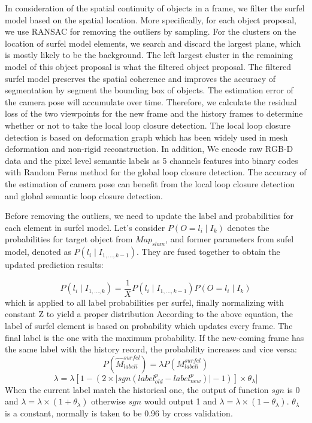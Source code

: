 \documentclass[conference]{IEEEtran}
\begin{document}
In consideration of the spatial continuity of objects in a frame, we filter the surfel model based on the spatial location.  More specifically, for each object proposal, we use RANSAC for removing the outliers by sampling. For the clusters on the location of surfel model elements, we search and discard the largest plane, which is mostly likely to be the background. The left largest cluster in the remaining model of this object proposal is what the filtered object proposal. The filtered surfel model preserves the spatial coherence and improves the accuracy of segmentation by segment the bounding box of objects. The estimation error of the camera pose will accumulate over time. Therefore, we calculate the residual loss of the two viewpoints for the new frame and the history frames to determine whether or not to take the local loop closure detection. The local loop closure detection is based on deformation graph \cite{sumner2007embedded} which has been widely used in mesh deformation and non-rigid reconstruction. In addition, We encode raw RGB-D data and the pixel level semantic labels as 5 channels features into binary codes with Random Ferns method \cite{ozuysal2010fast} for the global loop closure detection. The accuracy of the estimation of camera pose can benefit from the local loop closure detection and global semantic loop closure detection.   

Before removing the outliers, we need to update the label and probabilities for each element in surfel model. Let's consider $P(O=l_{i}\mid I_{k})$ denotes the probabilities for target object  from $Map_{slam}$, and former parameters from sufel model, denoted as $P(l_{i}\mid I_{1,...,k-1})$. They are fused together to obtain the updated prediction results:

\begin{equation}
P(l_{i}\mid I_{1,...,k})=\frac{1}{X}P(l_{i}\mid I_{1,...,k-1})P(O=l_{i}\mid I_{k})
\end{equation}
which is applied to all label probabilities per surfel, finally normalizing with constant Z to yield a proper distribution
According to the above equation, the label of surfel element is based on probability which updates every frame. The final label is the one with the maximum probability. If the new-coming frame has the same label with the  history  record, the probability increases and  vice versa:
\begin{equation}
P(\hat{M}^{surfel}_{labeli})=\lambda P(M^{surfel}_{labeli})
\end{equation}
\begin{equation}
\lambda = \lambda [1-(2\times \lvert sgn(label^{p}_{old}-label^{p}_{new} )\rvert-1)]\times \theta_{\lambda}]
\end{equation}
When the current label match the historical one, the output of function $sgn$ is 0 and $\lambda = \lambda\times(1+\theta_{\lambda})$ otherwise $sgn$ would output 1 and  $\lambda =\lambda\times(1-\theta_{\lambda})$.
$\theta_{\lambda}$ is a constant, normally is taken to be 0.96 by cross validation. 
\end{document}
